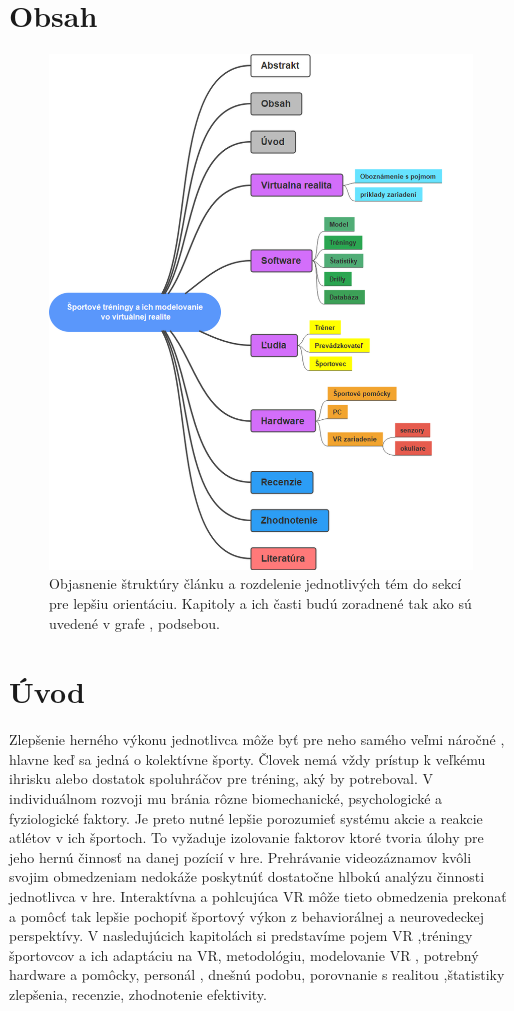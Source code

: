 \documentclass[10pt,twoside,slovak,a4paper]{article}										%
\begin{document}
\section{Obsah}
\begin{figure}[h]
\centering
\includegraphics[scale=0.5]{ mapa.png}
\caption{Objasnenie štruktúry článku a rozdelenie jednotlivých tém do sekcí pre lepšiu orientáciu. Kapitoly a ich časti budú zoradnené tak ako sú uvedené v grafe , podsebou.} 
\end{figure}

\section{Úvod}
Zlepšenie herného výkonu jednotlivca môže byť pre neho samého veľmi náročné , hlavne keď sa jedná o kolektívne športy. Človek nemá vždy prístup k veľkému ihrisku alebo dostatok spoluhráčov pre tréning, aký by potreboval. V individuálnom rozvoji mu bránia rôzne biomechanické, psychologické a fyziologické faktory. Je preto nutné lepšie porozumieť systému akcie a reakcie atlétov v ich športoch. To vyžaduje izolovanie faktorov ktoré tvoria úlohy pre jeho hernú činnosť na danej pozícií v hre. Prehrávanie videozáznamov kvôli svojim obmedzeniam nedokáže poskytnúť dostatočne hlbokú analýzu činnosti jednotlivca v hre. Interaktívna a pohlcujúca VR môže tieto obmedzenia prekonať a pomôcť tak lepšie pochopiť športový výkon z behaviorálnej a neurovedeckej perspektívy. V nasledujúcich kapitolách si predstavíme pojem VR ,tréningy športovcov a ich adaptáciu na VR, metodológiu, modelovanie VR , potrebný hardware a pomôcky, personál , dnešnú podobu, porovnanie s realitou ,štatistiky zlepšenia, recenzie, zhodnotenie efektivity. ~\cite{Hlavny:zdroj}
\end{document}
